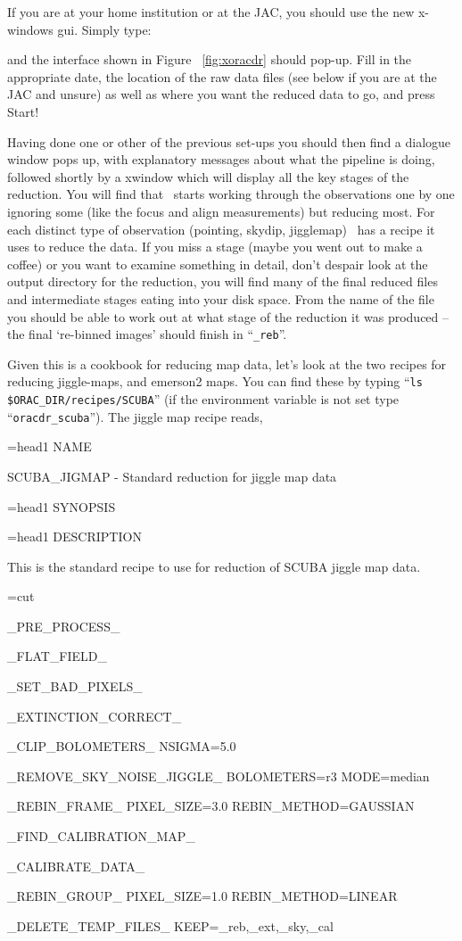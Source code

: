 \documentclass[twoside,11pt,noabs]{starlink}
\providecommand{\oracdr}{\xref{\textsc{orac-dr}}{sun231}{}}
\begin{document}
If you are at your home institution or at the JAC, you should use the
new x-windows gui. Simply type:

\begin{terminalv}
\end{terminalv}

and the interface shown in Figure \ \ref{fig:xoracdr} should pop-up.
Fill in the appropriate date, the location of the raw data files (see
below if you are at the JAC and unsure) as well as where you want the
reduced data to go, and press Start!

Having done one or other of the previous set-ups you should then find
a dialogue window pops up, with explanatory messages about what the
pipeline is doing, followed shortly by a xwindow which will display
all the key stages of the reduction.  You will find that \oracdr\
starts working through the observations one by one ignoring some (like
the focus and align measurements) but reducing most.  For each
distinct type of observation (pointing, skydip, jigglemap) \oracdr\
has a recipe it uses to reduce the data.  If you miss a stage (maybe
you went out to make a coffee) or you want to examine something in
detail, don't despair look at the output directory for the reduction,
you will find many of the final reduced files and intermediate stages
eating into your disk space.  From the name of the file you should be
able to work out at what stage of the reduction it was produced -- the
final `re-binned images' should finish in ``\texttt{\_reb}''.

Given this is a cookbook for reducing map data, let's look at the two
recipes for reducing jiggle-maps, and emerson2 maps.  You can find
these by typing ``\texttt{ls \$ORAC\_DIR/recipes/SCUBA}'' (if the environment
variable is not set type ``\texttt{oracdr\_scuba}'').  The jiggle map recipe
reads,

\begin{small}
\begin{terminalv}
=head1 NAME

SCUBA_JIGMAP - Standard reduction for jiggle map data

=head1 SYNOPSIS


=head1 DESCRIPTION

This is the standard recipe to use for reduction of SCUBA
jiggle map data.


=cut

_PRE_PROCESS_

_FLAT_FIELD_

_SET_BAD_PIXELS_

_EXTINCTION_CORRECT_

_CLIP_BOLOMETERS_ NSIGMA=5.0

_REMOVE_SKY_NOISE_JIGGLE_  BOLOMETERS=r3 MODE=median

_REBIN_FRAME_ PIXEL_SIZE=3.0 REBIN_METHOD=GAUSSIAN

_FIND_CALIBRATION_MAP_

_CALIBRATE_DATA_

_REBIN_GROUP_ PIXEL_SIZE=1.0 REBIN_METHOD=LINEAR

_DELETE_TEMP_FILES_ KEEP=_reb,_ext,_sky,_cal
\end{terminalv}
\end{small}
\end{document}
